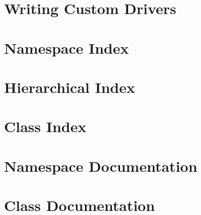 \documentclass{book}
\begin{document}
\chapter{Writing Custom Drivers}
\label{writing_drivers}
\hypertarget{writing_drivers}{}

\chapter{Namespace Index}

\chapter{Hierarchical Index}

\chapter{Class Index}

\chapter{Namespace Documentation}



\chapter{Class Documentation}



\printindex
\end{document}
